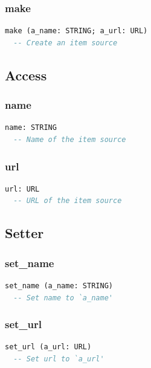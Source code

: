 \subsubsection{make}

\begin{lstlisting}[language=Eiffel]
make (a_name: STRING; a_url: URL)
  -- Create an item source
\end{lstlisting}

\subsection{Access}
\label{sec:item-source-access}

\subsubsection{name}

\begin{lstlisting}[language=Eiffel]
name: STRING
  -- Name of the item source
\end{lstlisting}

\subsubsection{url}

\begin{lstlisting}[language=Eiffel]
url: URL
  -- URL of the item source
\end{lstlisting}

\subsection{Setter}
\label{sec:item-source-setter}

\subsubsection{set\_name}

\begin{lstlisting}[language=Eiffel]
set_name (a_name: STRING)
  -- Set name to `a_name'
\end{lstlisting}

\subsubsection{set\_url}

\begin{lstlisting}[language=Eiffel]
set_url (a_url: URL)
  -- Set url to `a_url'
\end{lstlisting}

